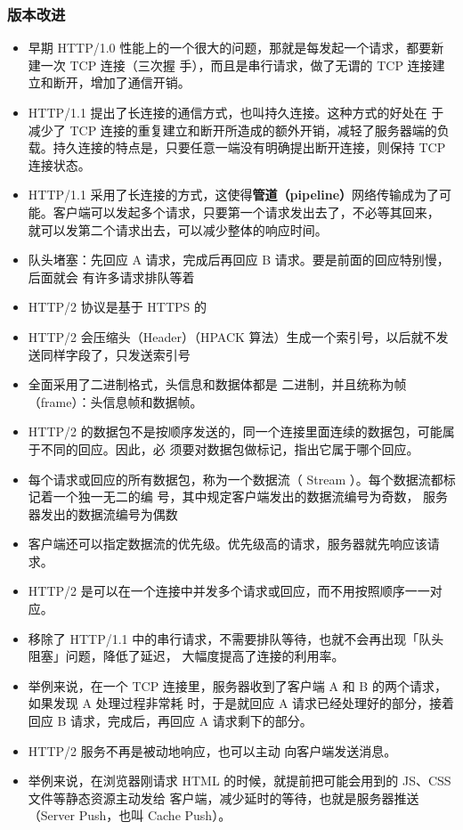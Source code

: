 \subsubsection{版本改进}
\begin{itemize}
\item 早期 HTTP/1.0 性能上的一个很大的问题，那就是每发起一个请求，都要新建一次 TCP 连接（三次握 手），而且是串行请求，做了无谓的 TCP 连接建立和断开，增加了通信开销。
\item HTTP/1.1 提出了长连接的通信方式，也叫持久连接。这种方式的好处在 于减少了 TCP 连接的重复建立和断开所造成的额外开销，减轻了服务器端的负载。持久连接的特点是，只要任意一端没有明确提出断开连接，则保持 TCP 连接状态。
\item HTTP/1.1 采用了长连接的方式，这使得\textbf{管道（pipeline）}网络传输成为了可能。客户端可以发起多个请求，只要第一个请求发出去了，不必等其回来， 就可以发第二个请求出去，可以减少整体的响应时间。
\item 队头堵塞：先回应 A 请求，完成后再回应 B 请求。要是前面的回应特别慢，后面就会 有许多请求排队等着
\item HTTP/2 协议是基于 HTTPS 的
\item HTTP/2 会压缩头（Header）（HPACK 算法）生成一个索引号，以后就不发送同样字段了，只发送索引号
\item 全面采用了二进制格式，头信息和数据体都是 二进制，并且统称为帧（frame）：头信息帧和数据帧。
\item HTTP/2 的数据包不是按顺序发送的，同一个连接里面连续的数据包，可能属于不同的回应。因此，必 须要对数据包做标记，指出它属于哪个回应。
\item 每个请求或回应的所有数据包，称为一个数据流（    Stream  ）。每个数据流都标记着一个独一无二的编 号，其中规定客户端发出的数据流编号为奇数，  服务器发出的数据流编号为偶数
\item 客户端还可以指定数据流的优先级。优先级高的请求，服务器就先响应该请求。
\item HTTP/2 是可以在一个连接中并发多个请求或回应，而不用按照顺序一一对应。
\item 移除了 HTTP/1.1 中的串行请求，不需要排队等待，也就不会再出现「队头阻塞」问题，降低了延迟， 大幅度提高了连接的利用率。
\item 举例来说，在一个 TCP 连接里，服务器收到了客户端 A 和 B 的两个请求，如果发现 A 处理过程非常耗 时，于是就回应 A 请求已经处理好的部分，接着回应 B 请求，完成后，再回应 A 请求剩下的部分。
\item HTTP/2 服务不再是被动地响应，也可以主动 向客户端发送消息。
\item 举例来说，在浏览器刚请求 HTML 的时候，就提前把可能会用到的 JS、CSS 文件等静态资源主动发给 客户端，减少延时的等待，也就是服务器推送（Server Push，也叫 Cache Push）。
\end{itemize}

